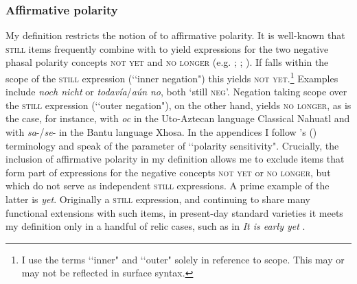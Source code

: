 \subsubsection{Affirmative polarity} My definition restricts the notion of  to affirmative polarity. It is well-known that \textsc{still} items frequently combine with  to yield expressions for the two negative phasal polarity concepts \textsc{not yet} and \textsc{no longer} (e.g. \cite{vanderAuwera1998};  \cite{vanBaar1997};  \cite{Loebner1989}). If  falls within the scope of the \textsc{still} expression (\lq\lq inner negation") this yields \textsc{not yet}.\footnote{I use the terms \lq\lq inner" and \lq\lq outer"  solely in reference to scope. This may or may not be reflected in surface syntax.} Examples include  \textit{noch nicht} or  \textit{todavía}/\textit{aún} \textit{no}, both \lq still \textsc{neg}'. Negation taking scope over the \textsc{still} expression  (\lq\lq outer negation"), on the other hand, yields \textsc{no longer}, as is the case, for instance, with \textit{oc} in the Uto-Aztecan language Classical Nahuatl and with \mbox{\textit{sa}-}/\mbox{\textit{se}-} in the Bantu language Xhosa. In the appendices I follow \citeauthor{vanBaar1997}'s (\citeyear{vanBaar1997}) terminology and speak of the parameter of \lq\lq polarity sensitivity". Crucially, the inclusion of affirmative polarity in my definition allows me to exclude items  that form part of expressions for the negative concepts \textsc{not yet} or \textsc{no longer}, but which do not serve as independent \textsc{still} expressions. A prime example of the latter is  \textit{yet}. Originally a \textsc{still} expression, and continuing to share many functional extensions with such items, in present-day standard varieties it meets my definition only in a handful of relic cases, such as in \textit{It is early yet} \parencite{KoenigTraugott1982}.

